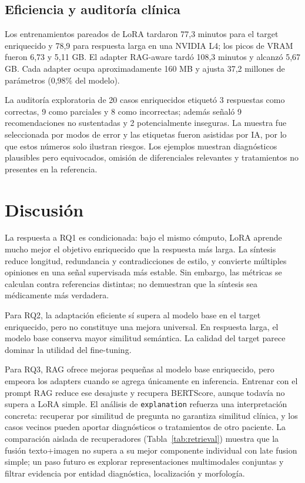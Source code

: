 \documentclass[11pt]{article}
\begin{document}
\subsection{Eficiencia y auditoría clínica}

Los entrenamientos pareados de LoRA tardaron 77,3 minutos para el target enriquecido y 78,9 para respuesta larga en una NVIDIA L4; los picos de VRAM fueron 6,73 y 5,11 GB. El adapter RAG-aware tardó 108,3 minutos y alcanzó 5,67 GB. Cada adapter ocupa aproximadamente 160 MB y ajusta 37,2 millones de parámetros (0,98\% del modelo).

La auditoría exploratoria de 20 casos enriquecidos etiquetó 3 respuestas como correctas, 9 como parciales y 8 como incorrectas; además señaló 9 recomendaciones no sustentadas y 2 potencialmente inseguras. La muestra fue seleccionada por modos de error y las etiquetas fueron asistidas por IA, por lo que estos números solo ilustran riesgos. Los ejemplos muestran diagnósticos plausibles pero equivocados, omisión de diferenciales relevantes y tratamientos no presentes en la referencia.

\section{Discusión}

La respuesta a RQ1 es condicionada: bajo el mismo cómputo, LoRA aprende mucho mejor el objetivo enriquecido que la respuesta más larga. La síntesis reduce longitud, redundancia y contradicciones de estilo, y convierte múltiples opiniones en una señal supervisada más estable. Sin embargo, las métricas se calculan contra referencias distintas; no demuestran que la síntesis sea médicamente más verdadera.

Para RQ2, la adaptación eficiente sí supera al modelo base en el target enriquecido, pero no constituye una mejora universal. En respuesta larga, el modelo base conserva mayor similitud semántica. La calidad del target parece dominar la utilidad del fine-tuning.

Para RQ3, RAG ofrece mejoras pequeñas al modelo base enriquecido, pero empeora los adapters cuando se agrega únicamente en inferencia. Entrenar con el prompt RAG reduce ese desajuste y recupera BERTScore, aunque todavía no supera a LoRA simple. El análisis de \texttt{explanation} refuerza una interpretación concreta: recuperar por similitud de pregunta no garantiza similitud clínica, y los casos vecinos pueden aportar diagnósticos o tratamientos de otro paciente. La comparación aislada de recuperadores (Tabla~\ref{tab:retrieval}) muestra que la fusión texto+imagen no supera a su mejor componente individual con late fusion simple; un paso futuro es explorar representaciones multimodales conjuntas y filtrar evidencia por entidad diagnóstica, localización y morfología.
\end{document}
